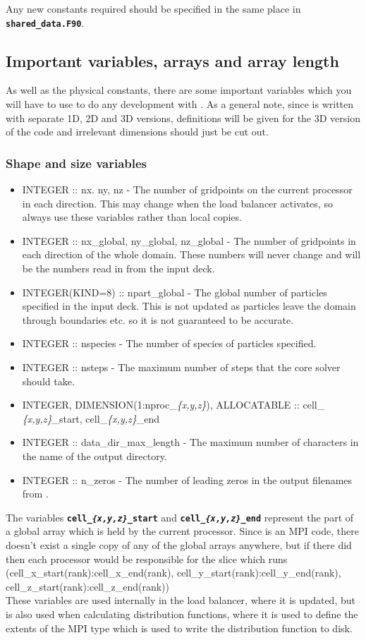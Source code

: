 \documentclass[12pt,a4paper]{article}
\newcommand{\inlinecode}[1]{{\color{warwickred} \bf\texttt{#1}}}
\newcommand{\EPOCH}{{\color{warwickdark}\fontfamily{phv}\selectfont{EPOCH}}}
\begin{document}
Any new constants required should be specified in the same place in
\inlinecode{shared\_data.F90}.

\subsection{Important variables, arrays and array length}
As well as the physical constants, there are some important variables which
you will have to use to do any development with \EPOCH. As a general note,
since {\EPOCH} is written with separate 1D, 2D and 3D versions, definitions will
be given for the 3D version of the code and irrelevant dimensions should just
be cut out.

\subsubsection{Shape and size variables}
\begin{itemize}
\item INTEGER :: nx. ny, nz - The number of gridpoints on the current
  processor in each direction. This may change when the load balancer
  activates, so always use these variables rather than local copies.
\item INTEGER :: nx\_global, ny\_global, nz\_global - The number of gridpoints
  in each direction of the whole domain. These numbers will never change and
  will be the numbers read in from the input deck.
\item INTEGER(KIND=8) :: npart\_global - The global number of particles
  specified in the input deck. This is not updated as particles leave the
  domain through boundaries etc. so it is not guaranteed to be accurate.
\item INTEGER :: nspecies - The number of species of particles specified.
\item INTEGER :: nsteps - The maximum number of steps that the core solver
  should take.
\item INTEGER, DIMENSION(1:nproc\_{\it \{x,y,z\}}), ALLOCATABLE :: cell\_{\it
    \{x,y,z\}}\_start, cell\_{\it \{x,y,z\}}\_end
\item INTEGER :: data\_dir\_max\_length - The maximum number of characters in
  the name of the output directory.
\item INTEGER :: n\_zeros - The number of leading zeros in the output filenames
  from \EPOCH.
\end{itemize}
The variables \inlinecode{cell\_{\it \{x,y,z\}}\_start} and
\inlinecode{cell\_{\it \{x,y,z\}}\_end} represent the part of a global array
which is held by the current processor. Since {\EPOCH} is an MPI code, there
doesn't exist a single copy of any of the global arrays anywhere, but if there
did then each processor would be responsible for the slice which runs\\
(cell\_x\_start(rank):cell\_x\_end(rank),
cell\_y\_start(rank):cell\_y\_end(rank),
cell\_z\_start(rank):cell\_z\_end(rank))\\
These variables are used internally in the load balancer, where it is updated,
but is also used when calculating distribution functions, where it is used to
define the extents of the MPI type which is used to write the distribution
function to disk.
\end{document}

